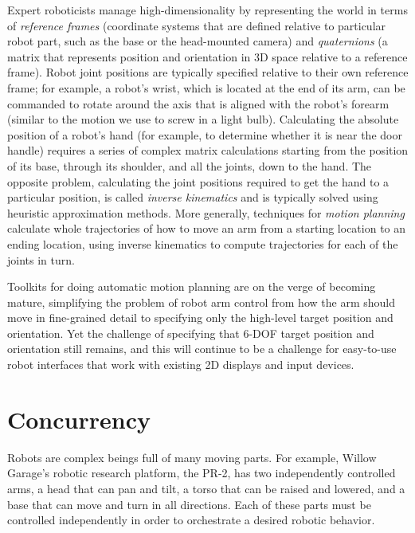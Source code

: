 \documentclass{article}
\begin{document}
Expert roboticists manage high-dimensionality by representing the world in terms of {\em reference frames} (coordinate systems that are defined relative to particular robot part, such as the base or the head-mounted camera) and {\em quaternions} (a matrix that represents position and orientation in 3D space relative to a reference frame). Robot joint positions are typically specified relative to their own reference frame; for example, a robot's wrist, which is located at the end of its arm, can be commanded to rotate around the axis that is aligned with the robot's forearm (similar to the motion we use to screw in a light bulb). Calculating the absolute position of a robot's hand (for example, to determine whether it is near the door handle) requires a series of complex matrix calculations starting from the position of its base, through its shoulder, and all the joints, down to the hand. The opposite problem, calculating the joint positions required to get the hand to a particular position, is called {\em inverse kinematics} and is typically solved using heuristic approximation methods. More generally, techniques for {\em motion planning} calculate whole trajectories of how to move an arm from a starting location to an ending location, using inverse kinematics to compute trajectories for each of the joints in turn.

Toolkits for doing automatic motion planning are on the verge of becoming mature, simplifying the problem of robot arm control from how the arm should move in fine-grained detail to specifying only the high-level target position and orientation. Yet the challenge of specifying that 6-DOF target position and orientation still remains, and this will continue to be a challenge for easy-to-use robot interfaces that work with existing 2D displays and input devices.

\section{Concurrency}


Robots are complex beings full of many moving parts. For example, Willow Garage's robotic research platform, the PR-2, has two independently controlled arms, a head that can pan and tilt, a torso that can be raised and lowered, and a base that can move and turn in all directions. Each of these parts must be controlled independently in order to orchestrate a desired robotic behavior.
\end{document}
